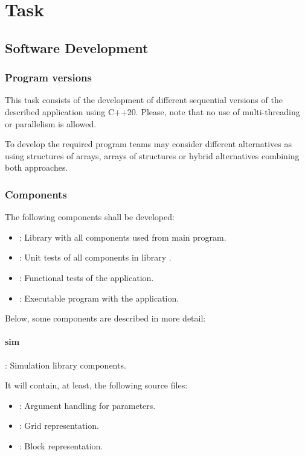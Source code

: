 \section{Task}

\subsection{Software Development}

\subsubsection{Program versions}
\label{sec:tasks:versions}

This task consists of the development of different sequential versions
of the described application using C++20. Please, note that no use of
multi-threading or parallelism is allowed.

To develop the required program teams may consider different alternatives
as using structures of arrays, arrays of structures or hybrid alternatives
combining both approaches.

\subsubsection{Components}

The following components shall be developed:

\begin{itemize}
  \item {}: 
        Library with all components used from main program.

  \item {}: 
        Unit tests of all components in library .

  \item {}:
        Functional tests of the application.

  \item {}: 
        Executable program with the application.

\end{itemize}

Below, some components are described in more detail:

\paragraph{sim}: Simulation library components.

It will contain, at least, the following source files:
\begin{itemize}
  \item {}: 
        Argument handling for  parameters. 
  \item {}: 
        Grid representation.
  \item {}: 
        Block representation.
\end{itemize}

